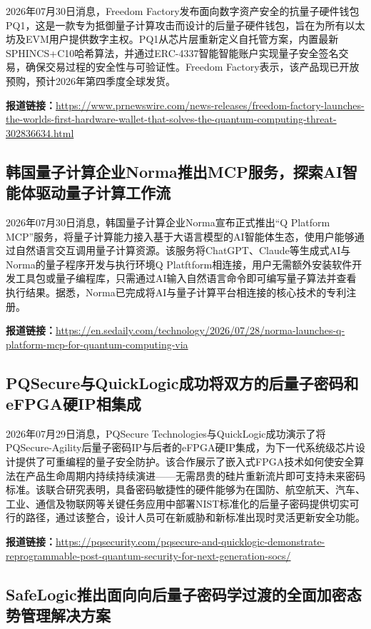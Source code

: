 \documentclass[12pt,a4paper]{ctexart}
\begin{document}
2026年07月30日消息，Freedom Factory发布面向数字资产安全的抗量子硬件钱包PQ1，这是一款专为抵御量子计算攻击而设计的后量子硬件钱包，旨在为所有以太坊及EVM用户提供数字主权。PQ1从芯片层重新定义自托管方案，内置最新SPHINCS+C10哈希算法，并通过ERC-4337智能智能账户实现量子安全签名交易，确保交易过程的安全性与可验证性。Freedom Factory表示，该产品现已开放预购，预计2026年第四季度全球发货。

\noindent\textbf{报道链接：}\url{https://www.prnewswire.com/news-releases/freedom-factory-launches-the-worlds-first-hardware-wallet-that-solves-the-quantum-computing-threat-302836634.html}

\subsection{ 韩国量子计算企业Norma推出MCP服务，探索AI智能体驱动量子计算工作流 }

2026年07月30日消息，韩国量子计算企业Norma宣布正式推出“Q Platform MCP”服务，将量子计算能力接入基于大语言模型的AI智能体生态，使用户能够通过自然语言交互调用量子计算资源。该服务将ChatGPT、Claude等生成式AI与Norma的量子程序开发与执行环境Q Platftform相连接，用户无需额外安装软件开发工具包或量子编程库，只需通过AI输入自然语言命令即可编写量子算法并查看执行结果。据悉，Norma已完成将AI与量子计算平台相连接的核心技术的专利注册。

\noindent\textbf{报道链接：}\url{https://en.sedaily.com/technology/2026/07/28/norma-launches-q-platform-mcp-for-quantum-computing-via}

\subsection{ PQSecure与QuickLogic成功将双方的后量子密码和eFPGA硬IP相集成 }

2026年07月29日消息，PQSecure Technologies与QuickLogic成功演示了将PQSecure-Agility后量子密码IP与后者的eFPGA硬IP集成，为下一代系统级芯片设计提供了可重编程的量子安全防护。该合作展示了嵌入式FPGA技术如何使安全算法在产品生命周期内持续持续演进——无需昂贵的硅片重新流片即可支持未来密码标准。该联合研究表明，具备密码敏捷性的硬件能够为在国防、航空航天、汽车、工业、通信及物联网等关键任务应用中部署NIST标准化的后量子密码提供切实可行的路径，通过该整合，设计人员可在新威胁和新标准出现时灵活更新安全功能。

\noindent\textbf{报道链接：}\url{https://pqsecurity.com/pqsecure-and-quicklogic-demonstrate-reprogrammable-post-quantum-security-for-next-generation-socs/}

\subsection{ SafeLogic推出面向向后量子密码学过渡的全面加密态势管理解决方案 }
\end{document}
